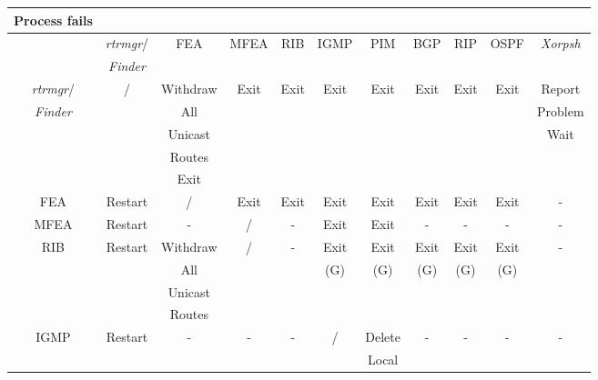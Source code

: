 \documentclass[11pt]{article}
\makeatletter
\newcommand{\finder} {{\em Finder}\@\xspace}
\newcommand{\xorpsh} {{\em Xorpsh}\@\xspace}
\newcommand{\rtrmgr} {{\em rtrmgr}\@\xspace}
\makeatother
\begin{document}
\begin{table}[ht]
\begin{center}
\begin{tabular}{|c|c|c|c|c|c|c|c|c|c|c|}
\hline
Process fails   &                 &          &      &      &      &         &      &      &      &         \\\hline
                & \rtrmgr/        & FEA      & MFEA & RIB  & IGMP & PIM     & BGP  & RIP  & OSPF & \xorpsh \\
                & \finder         &          &      &      &      &         &      &      &      &         \\\hline
\rtrmgr/        & /               & Withdraw & Exit & Exit & Exit & Exit    & Exit & Exit & Exit & Report  \\
\finder         &                 & All      &      &      &      &         &      &      &      & Problem \\
                &                 & Unicast  &      &      &      &         &      &      &      & Wait    \\
                &                 & Routes   &      &      &      &         &      &      &      &         \\
                &                 & Exit     &      &      &      &         &      &      &      &         \\\hline
FEA             &  Restart        & /        & Exit & Exit & Exit & Exit    & Exit & Exit & Exit & -       \\\hline
MFEA            &  Restart        & -        & /    & -    & Exit & Exit    & -    & -    & -    & -       \\\hline
RIB             &  Restart        & Withdraw & /    & -    & Exit & Exit    & Exit & Exit & Exit & -       \\
                &                 & All      &      &      & (G)  & (G)     & (G)  & (G)  & (G)  &         \\
                &                 & Unicast  &      &      &      &         &      &      &      &         \\
                &                 & Routes   &      &      &      &         &      &      &      &         \\\hline
IGMP            &  Restart        & -        & -    & -    & /    & Delete  & -    & -    & -    & -       \\
                &                 &          &      &      &      & Local   &      &      &      &         \\

\end{tabular}
\end{center}
\end{table}
\end{document}
